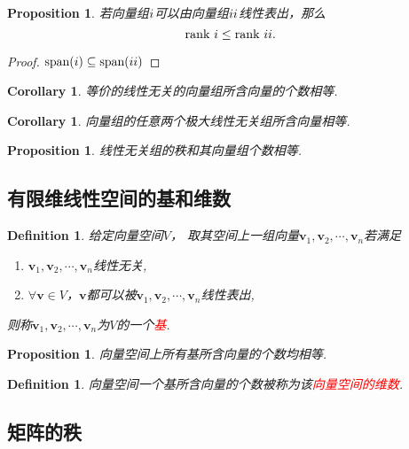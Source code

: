 \documentclass{article}
\newtheorem{corollary}[theorem]{Corollary}
\newtheorem{proposition}[theorem]{Proposition}
\newtheorem{definition}[theorem]{Definition}
\newcommand{\mbf}[1]{\bm{#1}}
\newcommand{\redt}[1]{\textcolor{red}{#1}}
\begin{document}
\begin{proposition}
\rm 若向量组$\uppercase\expandafter{\romannumeral1}$可以由向量组$\uppercase\expandafter{\romannumeral2}$线性表出，那么
$$
\text{rank}~\uppercase\expandafter{\romannumeral1} \leq \text{rank}~\uppercase\expandafter{\romannumeral2}. 
$$
\end{proposition}

\begin{proof}
$\text{span}(\uppercase\expandafter{\romannumeral1}) \subseteq \text{span}(\uppercase\expandafter{\romannumeral2})$
\end{proof}

\begin{corollary}
\rm 等价的线性无关的向量组所含向量的个数相等. 
\end{corollary}


\begin{corollary}
\rm 向量组的任意两个极大线性无关组所含向量相等.
\end{corollary}

\begin{proposition}
\rm 线性无关组的秩和其向量组个数相等.
\end{proposition}


\subsection{有限维线性空间的基和维数}

\begin{definition}
\rm 给定向量空间$V$， 取其空间上一组向量$\mbf{v}_1,\mbf{v}_2,\cdots,\mbf{v}_n$若满足
\begin{enumerate}
	\item $\mbf{v}_1,\mbf{v}_2,\cdots,\mbf{v}_n$线性无关,
	\item $\forall \mbf{v} \in V$，$\mbf{v}$都可以被$\mbf{v}_1,\mbf{v}_2,\cdots,\mbf{v}_n$线性表出,
\end{enumerate}
则称$\mbf{v}_1,\mbf{v}_2,\cdots,\mbf{v}_n$为$V$的一个\redt{基}.
\end{definition}

\begin{proposition}
\rm 向量空间上所有基所含向量的个数均相等.
\end{proposition}

\begin{definition}
\rm 向量空间一个基所含向量的个数被称为该\redt{向量空间的维数}.
\end{definition}

\subsection{矩阵的秩}
\end{document}
